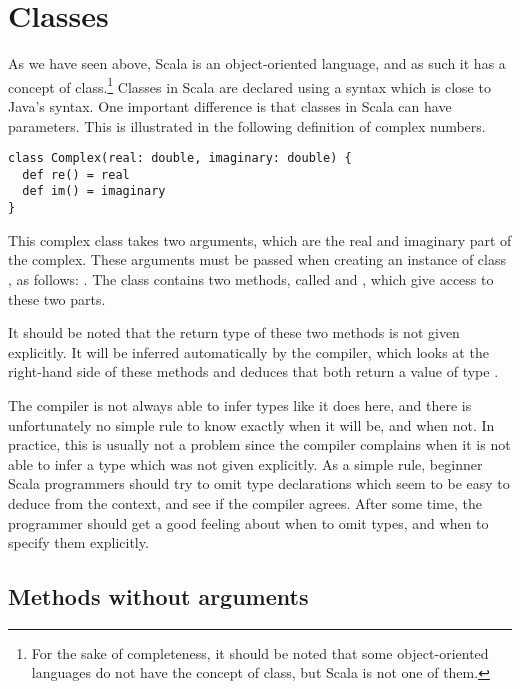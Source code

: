 \documentclass[a4paper,12pt,twoside,titlepage]{article}
\newcommand{\langname}[1]{#1\xspace}
\newcommand{\Scala}{\langname{Scala}}
\newcommand{\Java}{\langname{Java}}
\begin{document}

\section{Classes}
\label{sec:classes}

As we have seen above, \Scala is an object-oriented language, and as
such it has a concept of class.\footnote{For the sake of completeness,
  it should be noted that some object-oriented languages do not have
  the concept of class, but \Scala is not one of them.}
Classes in \Scala are declared using a syntax which is close to
\Java's syntax. One important difference is that classes in \Scala can
have parameters. This is illustrated in the following definition of
complex numbers.
\begin{lstlisting}
class Complex(real: double, imaginary: double) {
  def re() = real
  def im() = imaginary
}
\end{lstlisting}
This complex class takes two arguments, which are the real and
imaginary part of the complex. These arguments must be passed when
creating an instance of class , as follows: . The class contains two methods, called 
and , which give access to these two parts.

It should be noted that the return type of these two methods is not
given explicitly. It will be inferred automatically by the compiler,
which looks at the right-hand side of these methods and deduces that
both return a value of type .

The compiler is not always able to infer types like it does here, and
there is unfortunately no simple rule to know exactly when it will be,
and when not. In practice, this is usually not a problem since the
compiler complains when it is not able to infer a type which was not
given explicitly. As a simple rule, beginner \Scala programmers should
try to omit type declarations which seem to be easy to deduce from the
context, and see if the compiler agrees. After some time, the
programmer should get a good feeling about when to omit types, and
when to specify them explicitly.

\subsection{Methods without arguments}
\label{sec:meth-wo-args}
\end{document}
